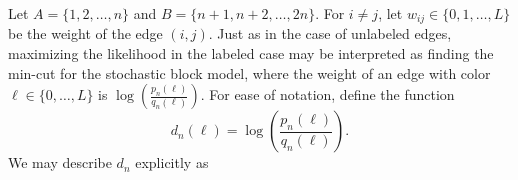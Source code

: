 

Let $A = \{1, 2, \dots, n\}$ and $B = \{n+1, n+2, \dots, 2n\}$. For $i \neq j$, let $w_{ij} \in \{0, 1, \dots, L\}$ be the weight of the edge $(i,j)$. Just as in the case of unlabeled edges, maximizing the likelihood in the labeled case may be interpreted as finding the min-cut for the stochastic block model, where the weight of an edge with color $\ell \in \{0, \dots, L\}$ is $\log \left(\frac{p_n(\ell)}{q_n(\ell)}\right)$. For ease of notation, define the function $$d_n(\ell) = \log \left( \frac{p_n(\ell)}{q_n(\ell)} \right).$$  We may describe $d_n$ explicitly as
